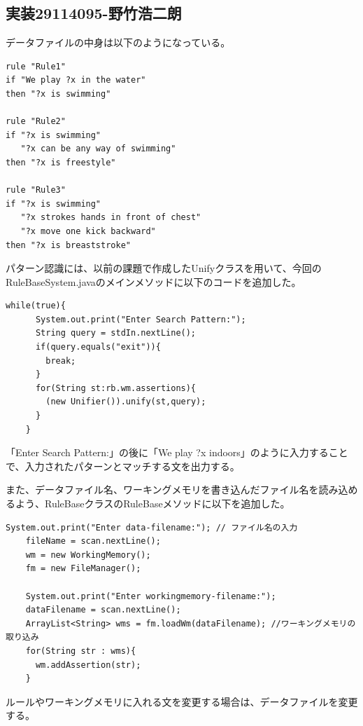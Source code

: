\documentclass{jarticle}
\begin{document}
\subsection{実装29114095-野竹浩二朗}
データファイルの中身は以下のようになっている。
\begin{screen}
\begin{verbatim}
rule "Rule1"
if "We play ?x in the water"
then "?x is swimming"

rule "Rule2"
if "?x is swimming"
   "?x can be any way of swimming"
then "?x is freestyle"

rule "Rule3"
if "?x is swimming"
   "?x strokes hands in front of chest"
   "?x move one kick backward"
then "?x is breaststroke"
\end{verbatim}
\end{screen}
パターン認識には、以前の課題で作成したUnifyクラスを用いて、今回のRuleBaseSystem.javaのメインメソッドに以下のコードを追加した。
\begin{lstlisting}[caption=追加したコード]
    while(true){
      System.out.print("Enter Search Pattern:");
      String query = stdIn.nextLine();
      if(query.equals("exit")){
        break;
      }
      for(String st:rb.wm.assertions){
        (new Unifier()).unify(st,query);
      }
    }
\end{lstlisting}
「Enter Search Pattern:」の後に「We play ?x indoors」のように入力することで、入力されたパターンとマッチする文を出力する。

また、データファイル名、ワーキングメモリを書き込んだファイル名を読み込めるよう、RuleBaseクラスのRuleBaseメソッドに以下を追加した。
\begin{lstlisting}[caption=RuleBaseメソッド]
    System.out.print("Enter data-filename:"); // ファイル名の入力
    fileName = scan.nextLine();
    wm = new WorkingMemory();
    fm = new FileManager();

    System.out.print("Enter workingmemory-filename:");
    dataFilename = scan.nextLine();
    ArrayList<String> wms = fm.loadWm(dataFilename); //ワーキングメモリの取り込み
    for(String str : wms){
      wm.addAssertion(str);
    }
\end{lstlisting}
ルールやワーキングメモリに入れる文を変更する場合は、データファイルを変更する。
\end{document}
